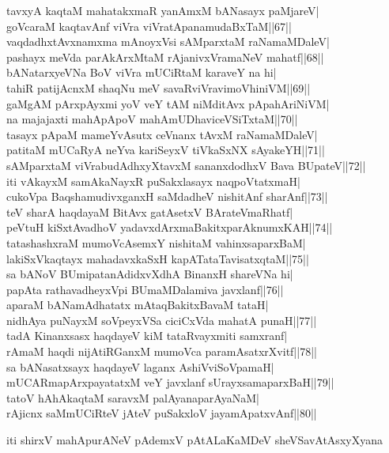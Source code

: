 \documentclass{article}
\begin{document}
tavxyA kaqtaM mahatakxmaR yanAmxM bANasayx paMjareV|\\
goVcaraM kaqtavAnf viVra viVratApanamudaBxTaM||67||\\
vaqdadhxtAvxnamxma mAnoyxVsi sAMparxtaM raNamaMDaleV|\\
pashayx meVda parAkArxMtaM rAjanivxVramaNeV mahatf||68||\\
bANatarxyeVNa BoV viVra mUCiRtaM karaveY na hi|\\
tahiR patijAcnxM shaqNu meV savaRviVravimoVhiniVM||69||\\
gaMgAM pArxpAyxmi yoV veY tAM niMditAvx pApahAriNiVM|\\
na majajaxti mahApApoV mahAmUDhaviceVSiTxtaM||70||\\
tasayx pApaM mameYvAsutx ceVnanx tAvxM raNamaMDaleV|\\
patitaM mUCaRyA neYva kariSeyxV tiVkaSxNX sAyakeYH||71||\\
sAMparxtaM viVrabudAdhxyXtavxM sananxdodhxV Bava BUpateV||72||\\
iti vAkayxM samAkaNayxR puSakxlasayx naqpoVtatxmaH|\\
cukoVpa BaqshamudivxganxH saMdadheV nishitAnf sharAnf||73||\\
teV sharA haqdayaM BitAvx gatAsetxV BArateVmaRhatf|\\
peVtuH kiSxtAvadhoV yadavxdArxmaBakitxparAknumxKAH||74||\\
tatashashxraM mumoVcAsemxY nishitaM vahinxsaparxBaM|\\
lakiSxVkaqtayx mahadavxkaSxH kapATataTavisatxqtaM||75||\\
sa bANoV BUmipatanAdidxvXdhA BinanxH shareVNa hi|\\
papAta rathavadheyxVpi BUmaMDalamiva javxlanf||76||\\
aparaM bANamAdhatatx mAtaqBakitxBavaM tataH|\\
nidhAya puNayxM soVpeyxVSa ciciCxVda mahatA punaH||77||\\
tadA Kinanxsasx haqdayeV kiM tataRvayxmiti samxranf|\\
rAmaM haqdi nijAtiRGanxM mumoVca paramAsatxrXvitf||78||\\
sa bANasatxsayx haqdayeV laganx AshiVviSoVpamaH|\\
mUCARmapArxpayatatxM veY javxlanf sUrayxsamaparxBaH||79||\\
tatoV hAhAkaqtaM saravxM palAyanaparAyaNaM|\\
rAjicnx saMmUCiRteV jAteV puSakxloV jayamApatxvAnf||80||

\begin{center}
iti shirxV mahApurANeV pAdemxV pAtALaKaMDeV sheVSavAtAsxyXyana
\end{center}
\end{document}
